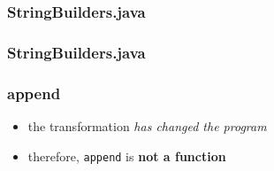 \begin{frame}[fragile]
\frametitle{StringBuilders.java}

\end{frame}

\begin{frame}[fragile]
\frametitle{StringBuilders.java}

\end{frame}

\begin{frame}[fragile]
\frametitle{append}
\begin{itemize}
  \item<1> the transformation \emph{has changed the program}
  \item<2> therefore, \lstinline$append$ is \textbf{not a function}
\end{itemize}
\end{frame}
